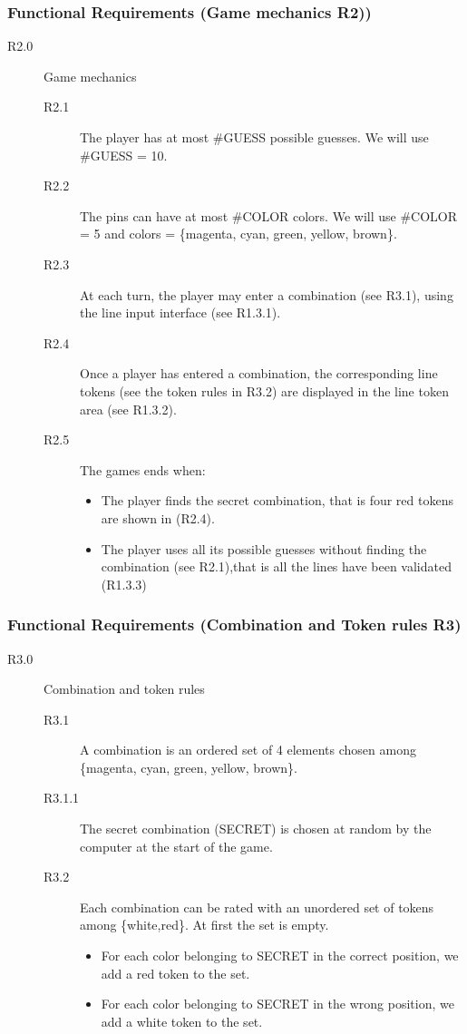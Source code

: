 \documentclass[10pt, handout]{beamer}
\begin{document}
\begin{frame}[shrink]
  \frametitle{Functional Requirements (Game mechanics R2))}
  \begin{description}
  \item[R2.0] Game mechanics
    \begin{description}
    \item[R2.1] The player has at most \#GUESS possible guesses.
                We will use \#GUESS = 10.
    \item[R2.2] The pins can have at most \#COLOR colors.
                We will use \#COLOR = 5 and colors = \{magenta, cyan, green,
                yellow, brown\}.
    \item[R2.3] At each turn, the player may enter a combination (see R3.1),
      using the line input interface (see R1.3.1).
    \item[R2.4] Once a player has entered a combination, the
      corresponding line tokens (see the token rules in R3.2) are displayed
      in the line token area (see R1.3.2).
    \item[R2.5] The games ends when:
      \begin{itemize}
      \item The player finds the secret combination, that is
        four red tokens are shown in (R2.4).
      \item The player uses all its possible guesses
            without finding the combination (see R2.1),that is
            all the lines have been validated (R1.3.3)
      \end{itemize}
    \end{description}
  \end{description}
\end{frame}

\begin{frame}[shrink]
  \frametitle{Functional Requirements (Combination and Token rules R3)}
  \begin{description}
  \item[R3.0] Combination and token rules
    \begin{description}
    \item[R3.1] A combination is an ordered set of 4 elements chosen
                among \{magenta, cyan, green, yellow, brown\}.
    \item[R3.1.1] The secret combination (SECRET) is chosen at random by the
      computer at the start of the game.
    \item[R3.2] Each combination can be rated with an unordered set of
      tokens among \{white,red\}.
      At first the set is empty.
      \begin{itemize}
      \item  For each color belonging to SECRET in the correct position,
        we add a red token to the set.
      \item For each color belonging to SECRET in the wrong position,
        we add a white token to the set.
      \end{itemize}
    \end{description}

  \end{description}
\end{frame}
\end{document}

